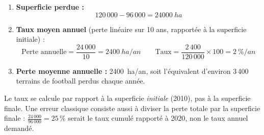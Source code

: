 \documentclass[11pt]{article}
\begin{document}
\begin{corrige}
\begin{enumerate}
\item \textbf{Superficie perdue :}
\[ 120\,000 - 96\,000 = \SI{24 000}{ha} \]
\item \textbf{Taux moyen annuel} (perte linéaire sur 10 ans, rapportée à la superficie initiale) :
\[ \text{Perte annuelle} = \dfrac{24\,000}{10} = \SI{2 400}{ha/an} \qquad \text{Taux} = \dfrac{2\,400}{120\,000} \times 100 = \SI{2}{\% / an} \]
\item \textbf{Perte moyenne annuelle :} \SI{2 400}{ha/an}, soit l'équivalent d'environ 3\,400 terrains de football perdus chaque année.
\end{enumerate}
\end{corrige}

\begin{attention}
Le taux se calcule par rapport à la superficie \emph{initiale} (2010), pas à la superficie finale. Une erreur classique consiste aussi à diviser la perte totale par la superficie finale : $\frac{24\,000}{96\,000} = 25\,\%$ serait le taux cumulé rapporté à 2020, non le taux annuel demandé.
\end{attention}
\end{document}
